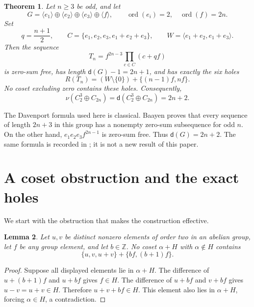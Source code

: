 \documentclass[11pt]{article}
\newtheorem{theorem}{Theorem}[section]
\newtheorem{lemma}[theorem]{Lemma}
\theoremstyle{definition}
\newcommand{\dd}{\mathsf d}
\newcommand{\ord}{\operatorname{ord}}
\begin{document}
\begin{theorem}\label{thm:main}
Let $n\geq3$ be odd, and let
\[
 G=\langle e_1\rangle\oplus\langle e_2\rangle\oplus\langle e_3\rangle
       \oplus\langle f\rangle,
 \qquad \ord(e_i)=2,\quad\ord(f)=2n.
\]
Set
\[
 q=\frac{n+1}{2},\qquad
 C=\{e_1,e_2,e_3,e_1+e_2+e_3\},\qquad
 W=\langle e_1+e_2,e_1+e_3\rangle.
\]
Then the sequence
\begin{equation}\label{eq:construction}
 T_n=f^{2n-3}\prod_{c\in C}(c+qf)
\end{equation}
is zero-sum free, has length $\dd(G)-1=2n+1$, and has exactly the six holes
\begin{equation}\label{eq:holes}
 R(T_n)=(W\setminus\{0\})+\{(n-1)f,nf\}.
\end{equation}
No coset excluding zero contains these holes. Consequently,
\begin{equation}\label{eq:value}
 \nu(C_2^3\oplus C_{2n})=\dd(C_2^3\oplus C_{2n})=2n+2.
\end{equation}
\end{theorem}

The Davenport formula used here is classical. Baayen \cite[p.~1]{B} proves that every sequence of length $2n+3$ in this group has a nonempty zero-sum subsequence for odd $n$. On the other hand, $e_1e_2e_3f^{2n-1}$ is zero-sum free. Thus $\dd(G)=2n+2$. The same formula is recorded in \cite[Proposition 2.1]{GY}; it is not a new result of this paper.

\section{A coset obstruction and the exact holes}

We start with the obstruction that makes the construction effective.

\begin{lemma}\label{lem:coset}
Let $u,v$ be distinct nonzero elements of order two in an abelian group, let $f$ be any group element, and let $b\in\mathbb Z$. No coset $\alpha+H$ with $\alpha\notin H$ contains
\[
 \{u,v,u+v\}+\{bf,(b+1)f\}.
\]
\end{lemma}
\begin{proof}
Suppose all displayed elements lie in $\alpha+H$. The difference of $u+(b+1)f$ and $u+bf$ gives $f\in H$. The difference of $u+bf$ and $v+bf$ gives $u-v=u+v\in H$. Therefore $u+v+bf\in H$. This element also lies in $\alpha+H$, forcing $\alpha\in H$, a contradiction.
\end{proof}
\end{document}

